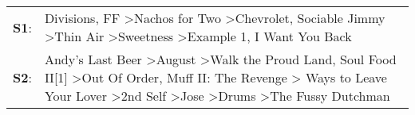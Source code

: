 \begin{supertabular}{p{0.03\textwidth}p{0.92\textwidth}}
 \textbf{S1}:  &                                                                                                                                                             Divisions\textsuperscript{}, \enspace FF\textsuperscript{} \textgreater \enspace Nachos for Two\textsuperscript{} \textgreater \enspace Chevrolet\textsuperscript{}, \enspace Sociable Jimmy\textsuperscript{} \textgreater \enspace Thin Air\textsuperscript{} \textgreater \enspace Sweetness\textsuperscript{} \textgreater \enspace Example 1\textsuperscript{}, \enspace I Want You Back\textsuperscript{}  \enspace  \\
 \textbf{S2}:  &  Andy's Last Beer\textsuperscript{} \textgreater \enspace August\textsuperscript{} \textgreater \enspace Walk the Proud Land\textsuperscript{}, \enspace Soul Food II[1]\textsuperscript{} \textgreater \enspace Out Of Order\textsuperscript{}, \enspace Muff II: The Revenge\textsuperscript{} \textgreater {} Ways to Leave Your Lover\textsuperscript{} \textgreater \enspace 2nd Self\textsuperscript{} \textgreater \enspace Jose\textsuperscript{} \textgreater \enspace Drums\textsuperscript{} \textgreater \enspace The Fussy Dutchman\textsuperscript{}  \enspace  \\
\end{supertabular}
